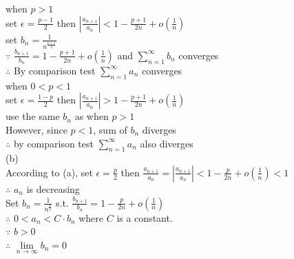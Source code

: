 \documentclass{article}
\begin{document}
when $p > 1$\\

set $\epsilon = \frac{p-1}{2}$ \quad then $\left|\frac{a_{n+1}}{a_n}\right| < 1 - \frac{p+1}{2n} + o(\frac{1}{n})$\\

set $b_n = \frac{1}{n^{\frac{p+1}{2}}}$\\

$\because$ \qquad $\displaystyle \frac{b_{n+1}}{b_n} = 1 - \frac{p+1}{2n} + o(\frac{1}{n})$ and $\displaystyle \sum \limits_{n=1}^\infty b_n$ \quad converges\\

$\therefore$ \qquad By comparison test \quad $\displaystyle \sum \limits_{n=1}^\infty a_n$ \quad converges\\

when $0 < p < 1$\\

set $\epsilon = \frac{1-p}{2}$ \quad then $\left|\frac{a_{n+1}}{a_n}\right| > 1 - \frac{p+1}{2n} + o(\frac{1}{n})$\\

use the same $b_n$ as when $p > 1$\\

However, since $p < 1$, sum of $b_n$ diverges\\

$\therefore$ \qquad by comparison test \quad $\displaystyle \sum \limits_{n=1}^\infty a_n$ \quad also diverges\\

(b)\\

According to (a), set $\epsilon = \frac{p}{2}$ \quad then $\displaystyle \frac{a_{n+1}}{a_n} = \left|\frac{a_{n+1}}{a_n}\right| < 1 - \frac{p}{2n} + o(\frac{1}{n}) < 1$\\

$\therefore$ \qquad $a_n$ is decreasing\\

Set $\displaystyle b_n = \frac{1}{n^{\frac{p}{2}}}$ \quad s.t. \quad $\displaystyle \frac{b_{n+1}}{b_n} = 1 - \frac{p}{2n} + o(\frac{1}{n})$\\

$\therefore$ \qquad $0 < a_n < C \cdot b_n$ where $C$ is a constant.\\

$\because$ \qquad $b>0$\\

$\therefore$ \qquad $\displaystyle \lim \limits_{n \to \infty} b_n = 0$\\
\end{document}
